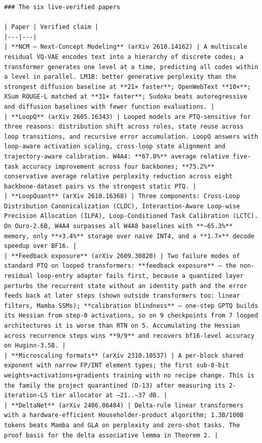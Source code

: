 \begin{Verbatim}[breaklines,breakanywhere,fontsize=\footnotesize]
### The six live-verified papers

| Paper | Verified claim |
|---|---|
| **NCM — Next-Concept Modeling** (arXiv 2610.14162) | A multiscale residual VQ-VAE encodes text into a hierarchy of discrete codes; a transformer generates one level at a time, predicting all codes within a level in parallel. LM1B: better generative perplexity than the strongest diffusion baseline at **21× faster**; OpenWebText **10×**; XSum ROUGE-L matched at **31× faster**; Sudoku beats autoregressive and diffusion baselines with fewer function evaluations. |
| **LoopQ** (arXiv 2605.16343) | Looped models are PTQ-sensitive for three reasons: distribution shift across roles, state reuse across loop transitions, and recursive error accumulation. LoopQ answers with loop-aware activation scaling, cross-loop state alignment and trajectory-aware calibration. W4A4: **67.8%** average relative five-task accuracy improvement across four backbones; **75.2%** conservative average relative perplexity reduction across eight backbone-dataset pairs vs the strongest static PTQ. |
| **LoopQuant** (arXiv 2610.16368) | Three components: Cross-Loop Distribution Canonicalization (CLDC), Interaction-Aware Loop-wise Precision Allocation (ILPA), Loop-Conditioned Task Calibration (LCTC). On Ouro-2.6B, W4A4 surpasses all W4A8 baselines with **−65.3%** memory, only **+3.4%** storage over naive INT4, and a **1.7×** decode speedup over BF16. |
| **Feedback exposure** (arXiv 2609.30820) | Two failure modes of standard PTQ on looped transformers: **feedback exposure** — the non-residual loop-entry adapter fails first, because a quantized layer perturbs the recurrent state without an identity path and the error feeds back at later steps (shown outside transformers too: linear filters, Mamba SSMs); **calibration blindness** — one-step GPTQ builds its Hessian from step-0 activations, so on 9 checkpoints from 7 looped architectures it is worse than RTN on 5. Accumulating the Hessian across recurrence steps wins **9/9** and recovers bf16-level accuracy on Huginn-3.5B. |
| **Microscaling formats** (arXiv 2310.10537) | A per-block shared exponent with narrow FP/INT element types; the first sub-8-bit weights+activations+gradients training with no recipe change. This is the family the project quarantined (D-13) after measuring its 2-iteration-LS tier allocator at −21..−37 dB. |
| **DeltaNet** (arXiv 2406.06484) | Delta-rule linear transformers with a hardware-efficient Householder-product algorithm; 1.3B/100B tokens beats Mamba and GLA on perplexity and zero-shot tasks. The proof basis for the delta associative lemma in Theorem 2. |


\end{Verbatim}

